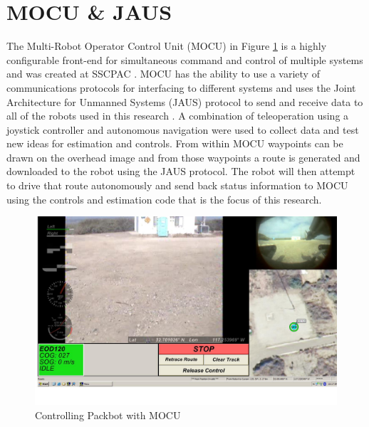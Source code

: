 \section{MOCU \& JAUS}
\label{sec:mocujaus}
The Multi-Robot Operator Control Unit (MOCU) in Figure \ref{fig:mocu} is a highly configurable front-end for simultaneous command and control of multiple systems and was created at SSCPAC \cite{PowellMOCU08}. MOCU has the ability to use a variety of communications protocols for interfacing to different systems and uses the Joint Architecture for Unmanned Systems (JAUS) protocol to send and receive data to all of the robots used in this research \cite{RoweJAUS08}. A combination of teleoperation using a joystick controller and autonomous navigation were used to collect data and test new ideas for estimation and controls. From within MOCU waypoints can be drawn on the overhead image and from those waypoints a route is generated and downloaded to the robot using the JAUS protocol. The robot will then attempt to drive that route autonomously and send back status information to MOCU using the controls and estimation code that is the focus of this research.

\begin{figure}[ht!]
	\centering
	\includegraphics[width=.75\textwidth]{images/mocuPackbotScreenshot}
	\caption{Controlling Packbot with MOCU}
	\label{fig:mocu}
\end{figure}

